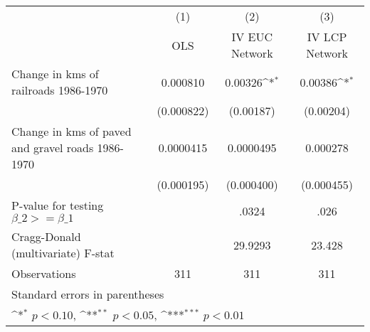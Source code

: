 {
\def\sym#1{\ifmmode^{#1}\else\(^{#1}\)\fi}
\begin{tabular}{l*{3}{c}}
\hline\hline
                &\multicolumn{1}{c}{(1)}&\multicolumn{1}{c}{(2)}&\multicolumn{1}{c}{(3)}\\
                &\multicolumn{1}{c}{OLS}&\multicolumn{1}{c}{IV EUC Network}&\multicolumn{1}{c}{IV LCP Network}\\
\hline
Change in kms of railroads 1986-1970& 0.000810         &  0.00326\sym{*}  &  0.00386\sym{*}  \\
                &(0.000822)         &(0.00187)         &(0.00204)         \\
[1em]
Change in kms of paved and gravel roads 1986-1970&0.0000415         &0.0000495         & 0.000278         \\
                &(0.000195)         &(0.000400)         &(0.000455)         \\
\hline
P-value for testing $\beta\_{2} >= \beta\_{1}$&                  &    .0324         &     .026         \\
Cragg-Donald (multivariate) F-stat&                  &  29.9293         &   23.428         \\
Observations    &      311         &      311         &      311         \\
\hline\hline
\multicolumn{4}{l}{\footnotesize Standard errors in parentheses}\\
\multicolumn{4}{l}{\footnotesize \sym{*} \(p<0.10\), \sym{**} \(p<0.05\), \sym{***} \(p<0.01\)}\\
\end{tabular}
}
